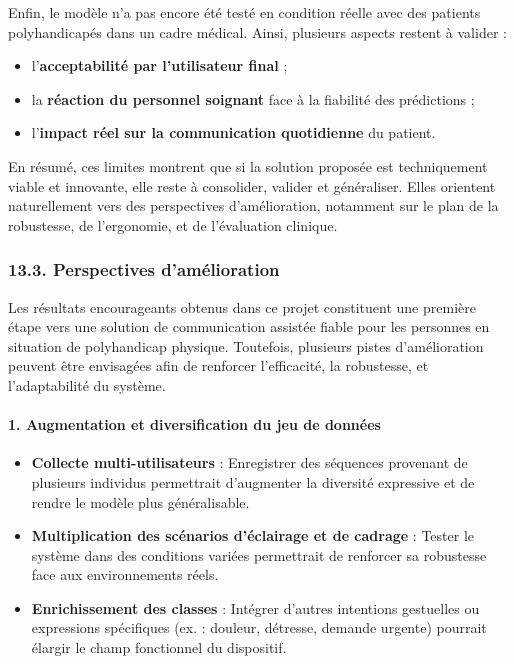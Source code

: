 \documentclass[
]{article}
\begin{document}
Enfin, le modèle n'a pas encore été testé en condition réelle avec des patients polyhandicapés dans un cadre médical. Ainsi, plusieurs aspects restent à valider :

\begin{itemize}
\item
  l'\textbf{acceptabilité par l'utilisateur final} ;
\item
  la \textbf{réaction du personnel soignant} face à la fiabilité des prédictions ;
\item
  l'\textbf{impact réel sur la communication quotidienne} du patient.
\end{itemize}

En résumé, ces limites montrent que si la solution proposée est techniquement viable et innovante, elle reste à consolider, valider et généraliser. Elles orientent naturellement vers des perspectives d'amélioration, notamment sur le plan de la robustesse, de l'ergonomie, et de l'évaluation clinique.

\hypertarget{perspectives-damuxe9lioration}{%
\subsubsection{13.3. Perspectives d'amélioration}\label{perspectives-damuxe9lioration}}

Les résultats encourageants obtenus dans ce projet constituent une première étape vers une solution de communication assistée fiable pour les personnes en situation de polyhandicap physique. Toutefois, plusieurs pistes d'amélioration peuvent être envisagées afin de renforcer l'efficacité, la robustesse, et l'adaptabilité du système.

\hypertarget{augmentation-et-diversification-du-jeu-de-donnuxe9es}{%
\paragraph{\texorpdfstring{\textbf{1. Augmentation et diversification du jeu de données}}{1. Augmentation et diversification du jeu de données}}\label{augmentation-et-diversification-du-jeu-de-donnuxe9es}}

\begin{itemize}
\item
  \textbf{Collecte multi-utilisateurs} : Enregistrer des séquences provenant de plusieurs individus permettrait d'augmenter la diversité expressive et de rendre le modèle plus généralisable.
\item
  \textbf{Multiplication des scénarios d'éclairage et de cadrage} : Tester le système dans des conditions variées permettrait de renforcer sa robustesse face aux environnements réels.
\item
  \textbf{Enrichissement des classes} : Intégrer d'autres intentions gestuelles ou expressions spécifiques (ex. : douleur, détresse, demande urgente) pourrait élargir le champ fonctionnel du dispositif.
\end{itemize}
\end{document}
